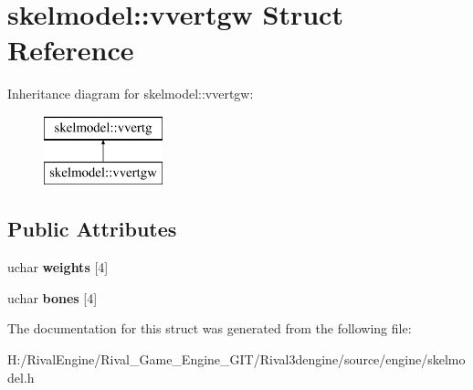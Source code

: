 \hypertarget{structskelmodel_1_1vvertgw}{}\section{skelmodel\+:\+:vvertgw Struct Reference}
\label{structskelmodel_1_1vvertgw}
Inheritance diagram for skelmodel\+:\+:vvertgw\+:\begin{figure}[H]
\begin{center}
\leavevmode
\includegraphics[height=2.000000cm]{structskelmodel_1_1vvertgw}
\end{center}
\end{figure}
\subsection*{Public Attributes}
\begin{DoxyCompactItemize}
\item 
\mbox{\label{structskelmodel_1_1vvertgw_a0a26fb0d1db89e50e67735ce6d621c7e}} 
uchar {\bfseries weights} \mbox{[}4\mbox{]}
\item 
\mbox{\label{structskelmodel_1_1vvertgw_a726ad8a2399591332378d99a04663bdf}} 
uchar {\bfseries bones} \mbox{[}4\mbox{]}
\end{DoxyCompactItemize}


The documentation for this struct was generated from the following file\+:\begin{DoxyCompactItemize}
\item 
H\+:/\+Rival\+Engine/\+Rival\+\_\+\+Game\+\_\+\+Engine\+\_\+\+G\+I\+T/\+Rival3dengine/source/engine/skelmodel.\+h\end{DoxyCompactItemize}

